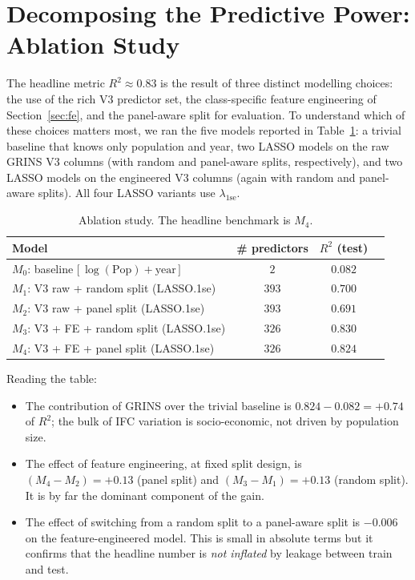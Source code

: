 \documentclass[11pt,a4paper]{article}
\begin{document}
\section{Decomposing the Predictive Power: Ablation Study}
\label{sec:ablation}

The headline metric \(R^{2}\approx 0.83\) is the result of three
distinct modelling choices: the use of the rich V3 predictor set, the
class-specific feature engineering of Section~\ref{sec:fe}, and the
panel-aware split for evaluation. To understand which of these choices
matters most, we ran the five models reported in
Table~\ref{tab:ablation}: a trivial baseline that knows only
population and year, two LASSO models on the raw GRINS V3 columns
(with random and panel-aware splits, respectively), and two LASSO
models on the engineered V3 columns (again with random and panel-aware
splits). All four LASSO variants use \(\lambda_{\mathrm{1se}}\).

\begin{table}[h!]
  \centering
  \begin{tabular}{lccc}
    \toprule
    Model & \# predictors & \(R^{2}\) (test) \\
    \midrule
    \(M_{0}\): baseline \(\bigl[\,\log(\mathrm{Pop}) + \text{year}\,\bigr]\) & \(2\)   & \(0.082\) \\
    \(M_{1}\): V3 raw + random split (LASSO.1se) & \(393\) & \(0.700\) \\
    \(M_{2}\): V3 raw + panel split  (LASSO.1se) & \(393\) & \(0.691\) \\
    \(M_{3}\): V3 + FE + random split (LASSO.1se) & \(326\) & \(0.830\) \\
    \(M_{4}\): V3 + FE + panel split  (LASSO.1se) & \(326\) & \(0.824\) \\
    \bottomrule
  \end{tabular}
  \caption{Ablation study. The headline benchmark is \(M_{4}\).}
  \label{tab:ablation}
\end{table}

Reading the table:
\begin{itemize}[leftmargin=2em]
  \item The contribution of GRINS over the trivial baseline is
    \(0.824 - 0.082 = +0.74\) of \(R^{2}\); the bulk of IFC variation
    is socio-economic, not driven by population size.
  \item The effect of feature engineering, at fixed split design, is
    \((M_{4} - M_{2}) = +0.13\) (panel split) and
    \((M_{3} - M_{1}) = +0.13\) (random split). It is by far the
    dominant component of the gain.
  \item The effect of switching from a random split to a panel-aware
    split is \(-0.006\) on the feature-engineered model. This is
    small in absolute terms but it confirms that the headline number
    is \emph{not inflated} by leakage between train and test.
\end{itemize}
\end{document}
